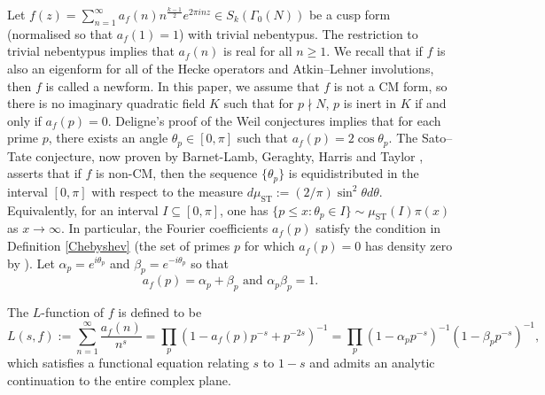 \documentclass[12pt,reqno]{amsart}
\theoremstyle{definition}
\numberwithin{equation}{section}
\begin{document}
Let $f(z)=\sum_{n=1}^{\infty}a_f(n)n^{\frac{k-1}{2}}e^{2\pi inz}\in S_k(\Gamma_0(N))$ be a  cusp form (normalised so that $a_f(1)=1$) with trivial nebentypus. The restriction to trivial nebentypus implies that $a_f(n)$ is real for all $n \geq 1$. We recall that if $f$ is also an eigenform for all of the Hecke operators and Atkin--Lehner involutions, then $f$ is called a newform.   In this paper, we assume that $f$ is not a CM form, so there is no imaginary quadratic field $K$ such that for $p\nmid N$, $p$ is inert in $K$ if and only if $a_f(p)=0$.  Deligne's proof of the Weil conjectures 
implies that for each prime $p$, there exists an angle $\theta_p\in[0,\pi]$ such that $a_f(p) = 2\cos\theta_p$. The Sato--Tate conjecture, now proven by Barnet-Lamb, Geraghty, Harris and Taylor \cite{BLGHT11}, 
asserts that if $f$ is non-CM, then the sequence $\{\theta_p\}$ is equidistributed in the interval $[0,\pi]$ with respect to the measure $d\mu_{\mathrm{ST}}:=(2/\pi)\sin^2\theta d\theta$.  Equivalently,  for an interval $I \subseteq [0, \pi]$, one has $\{p\leq x\colon \theta_p\in I\} \sim \mu_{\mathrm{ST}}(I)\pi(x)$ as $x\to\infty$. In particular, the Fourier coefficients $a_f(p)$ satisfy the condition in Definition \ref{Chebyshev} (the set of primes $p$ for which $a_f(p)=0$ has density zero by \cite[Corollaire 2, p.174]{Ser81}). Let $\alpha_p = e^{i \theta_p}$ and $\beta_p = e^{-i \theta_p}$ so that
\begin{equation} \label{ap}
a_f(p) = \alpha_p+\beta_p \text{ and } \alpha_p \beta_p =1. 
\end{equation}


The $L$-function of $f$ is defined to be 
$$
L(s, f):= \sum_{n=1}^{\infty} \frac{a_f(n)}{n^s}= \prod_{p} (1- a_f(p) p^{-s}+p^{-2s})^{-1}  = \prod_{p} (1-\alpha_p p^{-s})^{-1} (1-\beta_p p^{-s})^{-1}, 
$$
which satisfies a functional equation relating $s$ to $1-s$ and admits an analytic continuation to the entire complex plane. 
\end{document}
